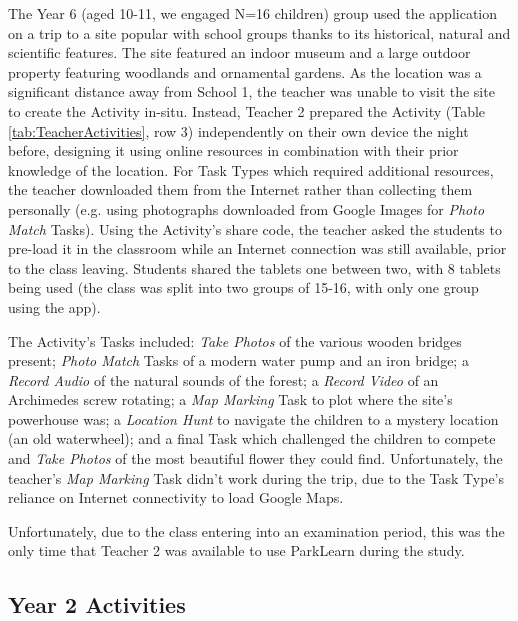 The Year 6 (aged 10-11, we engaged N=16 children) group used the application on a trip to a site popular with school groups thanks to its historical, natural and scientific features. The site featured an indoor museum and a large outdoor property featuring woodlands and ornamental gardens. As the location was a significant distance away from School 1, the teacher was unable to visit the site to create the Activity in-situ. Instead, Teacher 2 prepared the Activity (Table \ref{tab:TeacherActivities}, row 3) independently on their own device the night before, designing it using online resources in combination with their prior knowledge of the location. For Task Types which required additional resources, the teacher downloaded them from the Internet rather than collecting them personally (e.g. using photographs downloaded from Google Images for \textit{Photo Match} Tasks). Using the Activity's share code, the teacher asked the students to pre-load it in the classroom while an Internet connection was still available, prior to the class leaving. Students shared the tablets one between two, with 8 tablets being used (the class was split into two groups of 15-16, with only one group using the app). 

The Activity's Tasks included: \textit{Take Photos} of the various wooden bridges present; \textit{Photo Match} Tasks of a modern water pump and an iron bridge; a \textit{Record Audio} of the natural sounds of the forest; a \textit{Record Video} of an Archimedes screw rotating; a \textit{Map Marking} Task to plot where the site's powerhouse was; a \textit{Location Hunt} to navigate the children to a mystery location (an old waterwheel); and a final Task which challenged the children to compete and \textit{Take Photos} of the most beautiful flower they could find. Unfortunately, the teacher's \textit{Map Marking} Task didn't work during the trip, due to the Task Type's reliance on Internet connectivity to load Google Maps.

Unfortunately, due to the class entering into an examination period, this was the only time that Teacher 2 was available to use ParkLearn during the study.

\subsection{Year 2 Activities}

